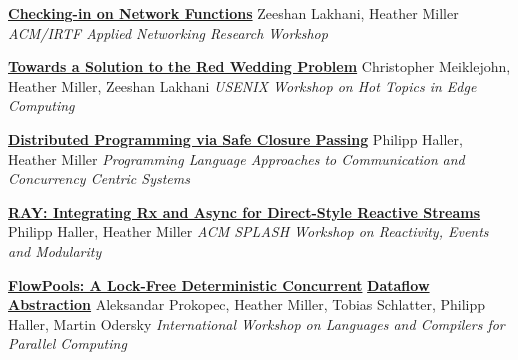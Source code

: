 \documentclass[9pt]{article}
\begin{document}
\noindent\href{https://dl.acm.org/citation.cfm?id=3341131}{\bf Checking-in on Network Functions}
\newline\noindent Zeeshan Lakhani, Heather Miller
\newline\noindent\emph{ACM/IRTF Applied Networking Research Workshop}
\bigskip

\noindent\href{https://www.usenix.org/system/files/conference/hotedge18/hotedge18-papers-meiklejohn.pdf}{\bf Towards a Solution to the Red Wedding Problem}
\newline\noindent Christopher Meiklejohn, Heather Miller, Zeeshan Lakhani
\newline\noindent\emph{USENIX Workshop on Hot Topics in Edge Computing}
\bigskip

\noindent\href{https://infoscience.epfl.ch/record/205039}{\bf Distributed Programming via Safe Closure Passing}
\newline\noindent Philipp Haller, Heather Miller
\newline\noindent\emph{Programming Language Approaches to Communication}
\newline\noindent\emph{and Concurrency Centric Systems}
\bigskip

\noindent\href{http://infoscience.epfl.ch/record/188383}{\bf RAY: Integrating Rx and Async for Direct-Style Reactive Streams}
\newline\noindent Philipp Haller, Heather Miller
\newline\noindent\emph{ACM SPLASH Workshop on Reactivity, Events and Modularity}
\bigskip

\noindent\href{http://infoscience.epfl.ch/record/180265}{\bf FlowPools: A Lock-Free Deterministic Concurrent}\vspace{-0.03in}
\newline\noindent\href{http://infoscience.epfl.ch/record/180265}{\bf Dataflow Abstraction}
\newline\noindent Aleksandar Prokopec, Heather Miller, Tobias Schlatter,
\newline\noindent Philipp Haller, Martin Odersky
\newline\noindent\emph{International Workshop on Languages and Compilers for Parallel Computing}
\vspace{0.03in}
\newline{}
\vspace{-0.03in}
\newline{}
\vspace{-0.03in}
\newline{}
\bigskip
\end{document}
